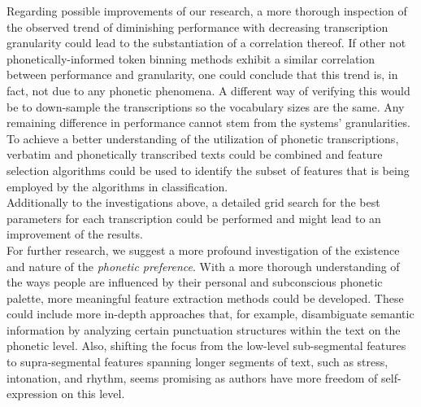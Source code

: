 Regarding possible improvements of our research, a more thorough inspection of the observed trend of diminishing performance with decreasing transcription granularity could lead to the substantiation of a correlation thereof.
If other not phonetically-informed token binning methods exhibit a similar correlation between performance and granularity, one could conclude that this trend is, in fact, not due to any phonetic phenomena.
A different way of verifying this would be to down-sample the transcriptions so the vocabulary sizes are the same.
Any remaining difference in performance cannot stem from the systems' granularities.\\
To achieve a better understanding of the utilization of phonetic transcriptions, verbatim and phonetically transcribed texts could be combined and feature selection algorithms could be used to identify the subset of features that is being employed by the algorithms in classification.\\
Additionally to the investigations above, a detailed grid search for the best parameters for each transcription could be performed and might lead to an improvement of the results.\\
For further research, we suggest a more profound investigation of the existence and nature of the \textit{phonetic preference}.
With a more thorough understanding of the ways people are influenced by their personal and subconscious phonetic palette, more meaningful feature extraction methods could be developed.
These could include more in-depth approaches that, for example, disambiguate semantic information by analyzing certain punctuation structures within the text on the phonetic level.
Also, shifting the focus from the low-level sub-segmental features to supra-segmental features spanning longer segments of text, such as stress, intonation, and rhythm, seems promising as authors have more freedom of self-expression on this level.